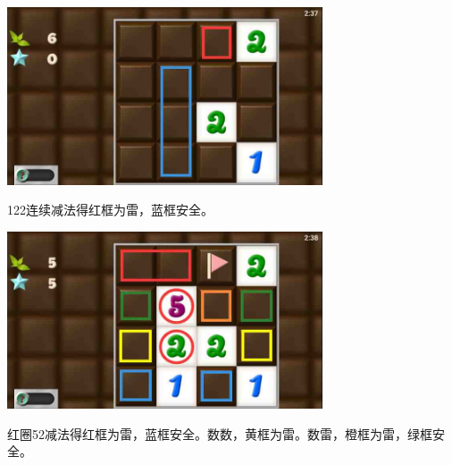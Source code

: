\subsection{} %
\begin{center}
    \includegraphics[width=0.7\textwidth]{puzzlelow/31-1.jpg}
\end{center}
122连续减法得红框为雷，蓝框安全。
\begin{center}
    \includegraphics[width=0.7\textwidth]{puzzlelow/31-2.jpg}
\end{center}
红圈52减法得红框为雷，蓝框安全。数数，黄框为雷。数雷，橙框为雷，绿框安全。

